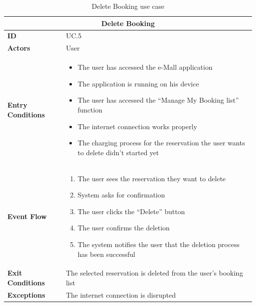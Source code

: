 \documentclass[12pt]{report}
\begin{document}
    \clearpage
    \begin{table}[h]
        \centering
        \begin{tabular}{ |p{4cm}|p{11cm}|  }
        \hline
        \multicolumn{2}{|c|}{\textbf{Delete Booking}} \\
        \hline
            \textbf{ID} &  UC.5\\
        \hline
            \textbf{Actors} & User\\
        \hline
            \textbf{Entry Conditions} &
                \begin{itemize}
                    \item The user has accessed the e-Mall application
                    \item The application is running on his device
                    \item The user has accessed the “Manage My Booking list” function
                    \item The internet connection works properly
                    \item The charging process for the reservation the user wants to delete didn't started yet
                \end{itemize}\\
        \hline
            \textbf{Event Flow} &
                \begin{enumerate}
                    \item The user sees the reservation they want to delete
                    \item System asks for confirmation
                    \item The user clicks the “Delete” button
                    \item The user confirms the deletion
                    \item The system notifies the user that the deletion process has been successful
                \end{enumerate}\\
        \hline
            \textbf{Exit Conditions} & The selected reservation is deleted from the user’s booking list\\
        \hline
            \textbf{Exceptions} & The internet connection is disrupted\\
        \hline
        \end{tabular}
        \caption{\label{demo-table}Delete Booking use case}
    \end{table}
    \clearpage
\end{document}
